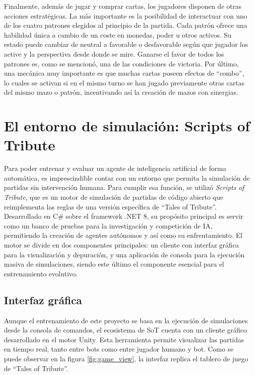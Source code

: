 Finalmente, además de jugar y comprar cartas, los jugadores disponen de otras acciones estratégicas. La más importante es la posibilidad de interactuar con uno de los cuatro patrones elegidos al principio de la partida. Cada patrón ofrece una habilidad única a cambio de un coste en monedas, poder u otros activos. Su estado puede cambiar de neutral a favorable o desfavorable según que jugador los active y la perspectiva desde donde se mire. Ganarse el favor de todos los patrones es, como se mencionó, una de las condiciones de victoria. Por último, una mecánica muy importante es que muchas cartas poseen efectos de ``combo'', lo cuales se activan si en el mismo turno se han jugado previamente otras cartas del mismo mazo o patrón, incentivando así la creación de mazos con sinergias.

\section{El entorno de simulación: Scripts of Tribute} \label{sec:scripts_of_tribute}

Para poder entrenar y evaluar un agente de inteligencia artificial de forma automática, es imprescindible contar con un entorno que permita la simulación de partidas sin intervención humana. Para cumplir esa función, se utilizó \textit{Scripts of Tribute}, que es un motor de simulación de partidas de código abierto que reimplementa las reglas de una versión específica de ``Tales of Tribute''. Desarrollado en C\# sobre el framework .NET 8, su propósito principal es servir como un banco de pruebas para la investigación y competición de IA, permitiendo la creación de agentes autónomos y así como su enfrentamiento. El motor se divide en dos componentes principales: un cliente con interfaz gráfica para la visualización y depuración, y una aplicación de consola para la ejecución masiva de simulaciones, siendo este último el componente esencial para el entrenamiento evolutivo.

\subsection{Interfaz gráfica} \label{sec:gui_scripts_of_tribute}

Aunque el entrenamiento de este proyecto se basa en la ejecución de simulaciones desde la consola de comandos, el ecosistema de SoT cuenta con un cliente gráfico desarrollado en el motor Unity. Esta herramienta permite visualizar las partidas en tiempo real, tanto entre bots como entre jugador humano y bot. Como se puede observar en la figura \ref{fig:game_view}, la interfaz replica el tablero de juego de ``Tales of Tribute''.

